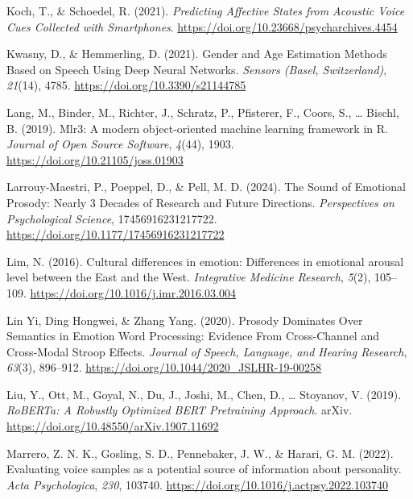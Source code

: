 \documentclass[
  english,
  man,floatsintext]{apa6}
\newlength{\cslhangindent}
\newenvironment{CSLReferences}[2] %
 {%
  \setlength{\parindent}{0pt}
  \ifodd #1 \everypar{\setlength{\hangindent}{\cslhangindent}}\ignorespaces\fi
  \ifnum #2 > 0
  \setlength{\parskip}{#2\baselineskip}
  \fi
 }%
 {}
\begin{document}
\begin{CSLReferences}{1}{0}
\leavevmode{}%
Koch, T., \& Schoedel, R. (2021). \emph{Predicting {Affective States} from {Acoustic Voice Cues Collected} with {Smartphones}}. \url{https://doi.org/10.23668/psycharchives.4454}

\leavevmode{}%
Kwasny, D., \& Hemmerling, D. (2021). Gender and {Age Estimation Methods Based} on {Speech Using Deep Neural Networks}. \emph{Sensors (Basel, Switzerland)}, \emph{21}(14), 4785. \url{https://doi.org/10.3390/s21144785}

\leavevmode{}%
Lang, M., Binder, M., Richter, J., Schratz, P., Pfisterer, F., Coors, S., \ldots{} Bischl, B. (2019). Mlr3: {A} modern object-oriented machine learning framework in {R}. \emph{Journal of Open Source Software}, \emph{4}(44), 1903. \url{https://doi.org/10.21105/joss.01903}

\leavevmode{}%
Larrouy-Maestri, P., Poeppel, D., \& Pell, M. D. (2024). The {Sound} of {Emotional Prosody}: {Nearly} 3 {Decades} of {Research} and {Future Directions}. \emph{Perspectives on Psychological Science}, 17456916231217722. \url{https://doi.org/10.1177/17456916231217722}

\leavevmode{}%
Lim, N. (2016). Cultural differences in emotion: Differences in emotional arousal level between the {East} and the {West}. \emph{Integrative Medicine Research}, \emph{5}(2), 105--109. \url{https://doi.org/10.1016/j.imr.2016.03.004}

\leavevmode{}%
Lin Yi, Ding Hongwei, \& Zhang Yang. (2020). Prosody {Dominates Over Semantics} in {Emotion Word Processing}: {Evidence From Cross-Channel} and {Cross-Modal Stroop Effects}. \emph{Journal of Speech, Language, and Hearing Research}, \emph{63}(3), 896--912. \url{https://doi.org/10.1044/2020_JSLHR-19-00258}

\leavevmode{}%
Liu, Y., Ott, M., Goyal, N., Du, J., Joshi, M., Chen, D., \ldots{} Stoyanov, V. (2019). \emph{{RoBERTa}: {A Robustly Optimized BERT Pretraining Approach}}. arXiv. \url{https://doi.org/10.48550/arXiv.1907.11692}

\leavevmode{}%
Marrero, Z. N. K., Gosling, S. D., Pennebaker, J. W., \& Harari, G. M. (2022). Evaluating voice samples as a potential source of information about personality. \emph{Acta Psychologica}, \emph{230}, 103740. \url{https://doi.org/10.1016/j.actpsy.2022.103740}


\end{CSLReferences}
\end{document}
